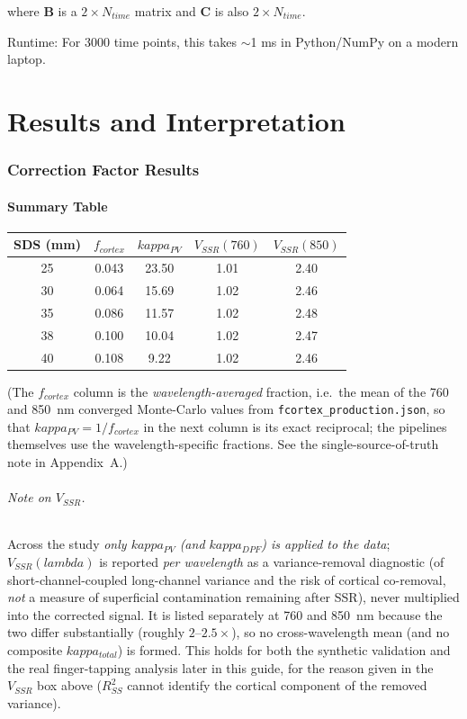 \documentclass[12pt]{article}
\def\kappa{kappa}%
\def\lambda{lambda}%
\def\mathrm#1{#1}%
\def\text#1{#1}%
\begin{document}
where $\mathbf{B}$ is a $2 \times N_{\text{time}}$ matrix and $\mathbf{C}$ is also $2 \times N_{\text{time}}$.

Runtime: For 3000 time points, this takes $\sim$1 ms in Python/NumPy on a modern laptop.

\newpage
\part{Results and Interpretation}

\section{Correction Factor Results}

\subsection{Summary Table}

\begin{center}
\begin{tabular}{ccccc}
\hline
\textbf{SDS (mm)} & $f_{\text{cortex}}$ & $\kappa_{\text{PV}}$ & $V_{\mathrm{SSR}}(760)$ & $V_{\mathrm{SSR}}(850)$ \\
\hline
25 & 0.043 & 23.50 & 1.01 & 2.40 \\
30 & 0.064 & 15.69 & 1.02 & 2.46 \\
35 & 0.086 & 11.57 & 1.02 & 2.48 \\
38 & 0.100 & 10.04 & 1.02 & 2.47 \\
40 & 0.108 & 9.22 & 1.02 & 2.46 \\
\hline
\end{tabular}
\end{center}

\noindent (The $f_{\text{cortex}}$ column is the \emph{wavelength-averaged} fraction, i.e.\ the mean of the 760 and 850~nm converged Monte-Carlo values from \texttt{fcortex\_production.json}, so that $\kappa_{\text{PV}}=1/f_{\text{cortex}}$ in the next column is its exact reciprocal; the pipelines themselves use the wavelength-specific fractions. See the single-source-of-truth note in Appendix~A.)

\paragraph{Note on $V_{\mathrm{SSR}}$.} Across the study \emph{only $\kappa_{\text{PV}}$ (and $\kappa_{\text{DPF}}$) is applied to the data}; $V_{\mathrm{SSR}}(\lambda)$ is reported \emph{per wavelength} as a variance-removal diagnostic (of short-channel-coupled long-channel variance and the risk of cortical co-removal, \emph{not} a measure of superficial contamination remaining after SSR), never multiplied into the corrected signal. It is listed separately at 760 and 850~nm because the two differ substantially (roughly $2$--$2.5\times$), so no cross-wavelength mean (and no composite $\kappa_{\text{total}}$) is formed. This holds for both the synthetic validation and the real finger-tapping analysis later in this guide, for the reason given in the $V_{\mathrm{SSR}}$ box above ($R^2_{\mathrm{SS}}$ cannot identify the cortical component of the removed variance).
\end{document}
